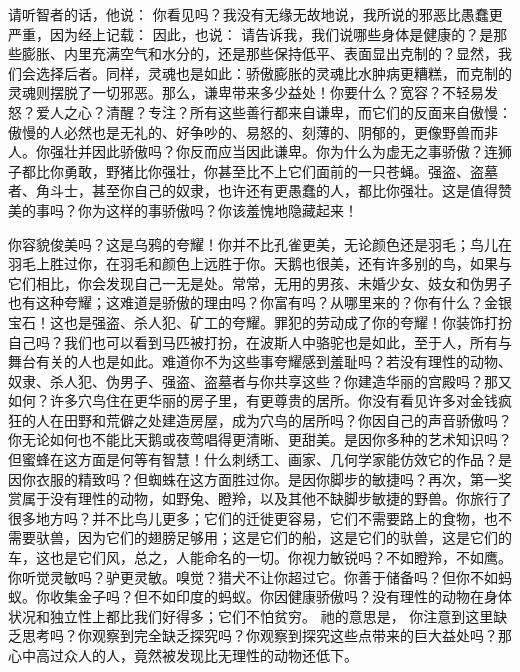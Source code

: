 请听智者的话，他说：  你看见吗？我没有无缘无故地说，我所说的邪恶比愚蠢更严重，因为经上记载： 因此，也说：  请告诉我，我们说哪些身体是健康的？是那些膨胀、内里充满空气和水分的，还是那些保持低平、表面显出克制的？显然，我们会选择后者。同样，灵魂也是如此：骄傲膨胀的灵魂比水肿病更糟糕，而克制的灵魂则摆脱了一切邪恶。那么，谦卑带来多少益处！你要什么？宽容？不轻易发怒？爱人之心？清醒？专注？所有这些善行都来自谦卑，而它们的反面来自傲慢：傲慢的人必然也是无礼的、好争吵的、易怒的、刻薄的、阴郁的，更像野兽而非人。你强壮并因此骄傲吗？你反而应当因此谦卑。你为什么为虚无之事骄傲？连狮子都比你勇敢，野猪比你强壮，你甚至比不上它们面前的一只苍蝇。强盗、盗墓者、角斗士，甚至你自己的奴隶，也许还有更愚蠢的人，都比你强壮。这是值得赞美的事吗？你为这样的事骄傲吗？你该羞愧地隐藏起来！\newline{}\par

你容貌俊美吗？这是乌鸦的夸耀！你并不比孔雀更美，无论颜色还是羽毛；鸟儿在羽毛上胜过你，在羽毛和颜色上远胜于你。天鹅也很美，还有许多别的鸟，如果与它们相比，你会发现自己一无是处。常常，无用的男孩、未婚少女、妓女和伪男子也有这种夸耀；这难道是骄傲的理由吗？你富有吗？从哪里来的？你有什么？金银宝石！这也是强盗、杀人犯、矿工的夸耀。罪犯的劳动成了你的夸耀！你装饰打扮自己吗？我们也可以看到马匹被打扮，在波斯人中骆驼也是如此，至于人，所有与舞台有关的人也是如此。难道你不为这些事夸耀感到羞耻吗？若没有理性的动物、奴隶、杀人犯、伪男子、强盗、盗墓者与你共享这些？你建造华丽的宫殿吗？那又如何？许多穴鸟住在更华丽的房子里，有更尊贵的居所。你没有看见许多对金钱疯狂的人在田野和荒僻之处建造房屋，成为穴鸟的居所吗？你因自己的声音骄傲吗？你无论如何也不能比天鹅或夜莺唱得更清晰、更甜美。是因你多种的艺术知识吗？但蜜蜂在这方面是何等有智慧！什么刺绣工、画家、几何学家能仿效它的作品？是因你衣服的精致吗？但蜘蛛在这方面胜过你。是因你脚步的敏捷吗？再次，第一奖赏属于没有理性的动物，如野兔、瞪羚，以及其他不缺脚步敏捷的野兽。你旅行了很多地方吗？并不比鸟儿更多；它们的迁徙更容易，它们不需要路上的食物，也不需要驮兽，因为它们的翅膀足够用；这是它们的船，这是它们的驮兽，这是它们的车，这也是它们风，总之，人能命名的一切。你视力敏锐吗？不如瞪羚，不如鹰。你听觉灵敏吗？驴更灵敏。嗅觉？猎犬不让你超过它。你善于储备吗？但你不如蚂蚁。你收集金子吗？但不如印度的蚂蚁。你因健康骄傲吗？没有理性的动物在身体状况和独立性上都比我们好得多；它们不怕贫穷。   祂的意思是， 你注意到这里缺乏思考吗？你观察到完全缺乏探究吗？你观察到探究这些点带来的巨大益处吗？那心中高过众人的人，竟然被发现比无理性的动物还低下。\newline{}\par

